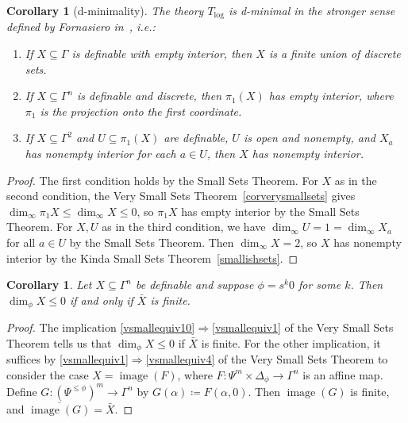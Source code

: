 \documentclass[11pt]{amsart}
\theoremstyle{plain}
\newtheorem{cor}[thm]{Corollary}
\theoremstyle{definition}
\numberwithin{equation}{section}
\newcommand\0{\varnothing}
\begin{document}
\begin{cor}[d-minimality]\label{corfornasierodmin}
The theory $T_{\log}$ is d-minimal in the stronger sense defined by Fornasiero in~\cite[Definition 9.1]{fornasiero-dimmatroiddense}, i.e.:
\begin{enumerate}
\item If $X \subseteq \Gamma$ is definable with empty interior, then $X$ is a finite union of discrete sets. 
\item If $X \subseteq \Gamma^n$ is definable and discrete, then $\pi_1(X)$ has empty interior, where $\pi_1$ is the projection onto the first coordinate.
\item If $X \subseteq \Gamma^2$ and $U \subseteq \pi_1(X)$ are definable, $U$ is open and nonempty, and $X_a$ has nonempty interior for each $a \in U$, then $X$ has nonempty interior.
\end{enumerate}
\end{cor}
\begin{proof}
The first condition holds by the Small Sets Theorem. For $X$ as in the second condition, the Very Small Sets Theorem~\ref{corverysmallsets} gives $\dim_\infty\pi_1 X\leq \dim_\infty X \leq 0$, so $\pi_1 X$ has empty interior by the Small Sets Theorem. For $X,U$ as in the third condition, we have $\dim_\infty U = 1 = \dim_{\infty} X_a$ for all $a \in U$ by the Small Sets Theorem. Then $\dim_\infty X = 2$, so $X$ has nonempty interior by the Kinda Small Sets Theorem~\ref{smallishsets}. 
\end{proof}





\begin{cor}\label{phi_small_is_finite_sk0}
Let $X\subseteq\Gamma^n$ be definable and suppose $\phi=s^k0$ for some $k$. Then $\dim_\phi X \leq 0$ if and only if $\bar{X}$ is finite.
\end{cor}
\begin{proof}
The implication \eqref{vsmallequiv10}$\Rightarrow$\eqref{vsmallequiv1} of the Very Small Sets Theorem tells us that $\dim_\phi X \leq 0$ if $\bar{X}$ is finite. For the other implication, it suffices by 
\eqref{vsmallequiv1}$\Rightarrow$\eqref{vsmallequiv4} of the Very Small Sets Theorem to consider the case $X=\operatorname{image}(F)$, where $F\colon\Psi^m\times\Delta_{\phi}\to\Gamma^n$ is an affine map. Define $G\colon(\Psi^{\leq \phi})^m\to\Gamma^n$ by $G(\alpha)\coloneqq F(\alpha,0)$. Then $\operatorname{image}(G)$ is finite, and $\overline{\operatorname{image}(G)}=\bar{X}$.
\end{proof}
\end{document}
